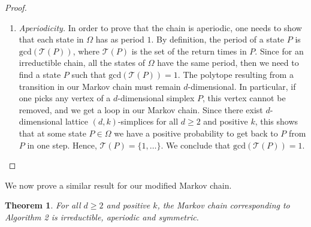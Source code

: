 \documentclass[a4paper]{article}
\newtheorem{theorem}{Theorem}
\begin{document}
\begin{proof}
\begin{enumerate}[i]
     \item \textit{Aperiodicity.}
     In order to prove that the chain is aperiodic, one needs to show that each state in $\Omega$ has as period $1$. By definition, the period of a state $P$ is $\mathrm{gcd}(\mathcal{T}(P))$, where $\mathcal{T}(P)$ is the set of the return times in $P$. Since for an irreductible chain, all the states of $\Omega$ have the same period, then we need to find a state $P$ such that $\mathrm{gcd}(\mathcal{T}(P)) = 1$. The polytope resulting from a transition in our Markov chain must remain $d$-dimensional. In particular, if one picks any vertex of a $d$-dimensional simplex $P$, this vertex cannot be removed, and we get a loop in our Markov chain. Since there exist $d$-dimensional lattice $(d,k)$-simplices for all $d\geq2$ and positive $k$, this shows that at some state $P \in\Omega$ we have a positive probability to get back to $P$ from $P$ in one step.
     Hence, $\mathcal{T}(P) = \{1, \dots\}$. We conclude that $\mathrm{gcd}(\mathcal{T}(P)) = 1$.
   \end{enumerate}
\end{proof}

We now prove a similar result for our modified Markov chain.

\begin{theorem}\label{Thm.Move}
  For all $d\geq2$ and positive $k$, the Markov chain corresponding to Algorithm 2 is irreductible, aperiodic and symmetric.
\end{theorem}
\end{document}
